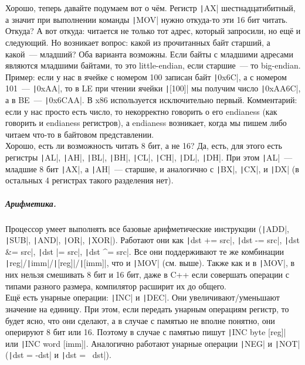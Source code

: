 \documentclass{article}
\begin{document}
    Хорошо, теперь давайте подумаем вот о чём. Регистр \texttt|AX| шестнадцатибитный, а значит при выполнении команды \texttt|MOV| нужно откуда-то эти 16 бит читать. Откуда? А вот откуда: читается не только тот адрес, который запросили, но ещё и следующий. Но возникает вопрос: какой из прочитанных байт старший, а какой~--- младший? Оба варианта возможны. Если байты с младшими адресами являются младшими байтами, то это little-endian, если старшие~--- то big-endian. Пример: если у нас в ячейке с номером 100 записан байт \texttt|0x6C|, а с номером 101~--- \texttt|0xAA|, то в LE при чтении ячейки \texttt|[100]| мы получим число \texttt|0xAA6C|, а в BE~--- \texttt|0x6CAA|. В x86 используется исключительно первый. Комментарий: если у нас просто есть число, то некорректно говорить о его endianess (как говорить и endianess регистров), а endianess возникает, когда мы пишем либо читаем что-то в байтовом представлении.\\
    Хорошо, есть ли возможность читать 8 бит, а не 16? Да, есть, для этого есть регистры \texttt|AL|, \texttt|AH|, \texttt|BL|, \texttt|BH|, \texttt|CL|, \texttt|CH|, \texttt|DL|, \texttt|DH|. При этом \texttt|AL|~--- младшие 8 бит \texttt|AX|, а \texttt|AH|~--- старшие, и аналогично с \texttt|BX|, \texttt|CX|, и \texttt|DX| (в остальных 4 регистрах такого разделения нет).
    \subparagraph{Арифметика.}
    Процессор умеет выполнять все базовые арифметические инструкции (\texttt|ADD|, \texttt|SUB|, \texttt|AND|, \texttt|OR|, \texttt|XOR|). Работают они как \texttt|dst += src|, \texttt|dst -= src|, \texttt|dst &= src|, \texttt|dst |= src|, \texttt|dst ^= src|. Все они поддерживают те же комбинации \texttt|reg|/\texttt|imm|/\texttt|[reg]|/\texttt|[imm]|, что и \texttt|MOV| (см. выше). Также как и в \texttt|MOV|, в них нельзя смешивать 8 бит и 16 бит, даже в C++ если совершать операции с типами разного размера, компилятор расширит их до общего.\\
    Ещё есть унарные операции: \texttt|INC| и \texttt|DEC|. Они увеличивают/уменьшают значение на единицу. При этом, если передать унарным операциям регистр, то будет ясно, что они сделают, а в случае с памятью не вполне понятно, они оперируют 8 бит или 16. Поэтому в случае с памятью пишут \texttt|INC byte [reg]| или \texttt|INC word [imm]|. Аналогично работают унарные операции \texttt|NEG| и \texttt|NOT| (\texttt|dst = -dst| и \texttt|dst = ~dst|).\\
\end{document}
